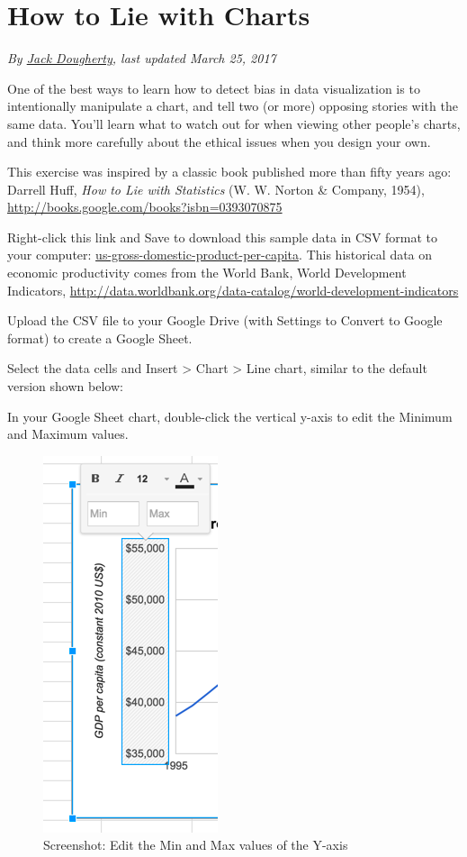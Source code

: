 \documentclass[
  english,
]{book}
\begin{document}
\hypertarget{how-to-lie-with-charts}{%
\section{How to Lie with Charts}\label{how-to-lie-with-charts}}

\emph{By \href{authors}{Jack Dougherty}, last updated March 25, 2017}

One of the best ways to learn how to detect bias in data visualization is to intentionally manipulate a chart, and tell two (or more) opposing stories with the same data. You'll learn what to watch out for when viewing other people's charts, and think more carefully about the ethical issues when you design your own.

This exercise was inspired by a classic book published more than fifty years ago: Darrell Huff, \emph{How to Lie with Statistics} (W. W. Norton \& Company, 1954), \url{http://books.google.com/books?isbn=0393070875}

Right-click this link and Save to download this sample data in CSV format to your computer: \href{data/us-gross-domestic-product-per-capita.csv}{us-gross-domestic-product-per-capita}. This historical data on economic productivity comes from the World Bank, World Development Indicators, \url{http://data.worldbank.org/data-catalog/world-development-indicators}

Upload the CSV file to your Google Drive (with Settings to Convert to Google format) to create a Google Sheet.

Select the data cells and Insert \textgreater{} Chart \textgreater{} Line chart, similar to the default version shown below:

In your Google Sheet chart, double-click the vertical y-axis to edit the Minimum and Maximum values.

\begin{figure}
\centering
\includegraphics{images/10-detect/y-axis-min-max.png}
\caption{Screenshot: Edit the Min and Max values of the Y-axis}
\end{figure}
\end{document}
